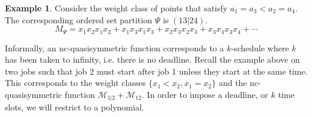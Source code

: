\documentclass[12pt,reqno]{amsart}
\numberwithin{definition}{section}
\theoremstyle{definition}
\newtheorem{example}[definition]{Example}
\newcommand{\ncM}{\mathcal{M}}
\begin{document}


\begin{example}

Consider the weight class of  points that satisfy $a_1 = a_3 < a_2 = a_4$.  The corresponding ordered set partition $\Psi$ is $(13|24)$.  
$$M_{\Psi} = x_1x_2x_1x_2 + x_1x_3x_1x_3 + x_2x_3x_2x_3 + x_3x_4x_3x_4 + \cdots$$  

\end{example}


Informally, an nc-quasisymmetric function corresponds to a
$k$-schedule where $k$ has been taken to infinity, i.e. there is no
deadline.  Recall the example above on two jobs such that job 2 must
start after job 1 unless they start at the same time.  This
corresponds to the weight classes $\{x_1 < x_2, x_1 = x_2\}$ and the
nc-quasisymmetric function $\ncM_{1|2} + \ncM_{12}$.  In order to
impose a deadline, or $k$ time slots, we will restrict to a
polynomial.
\end{document}
